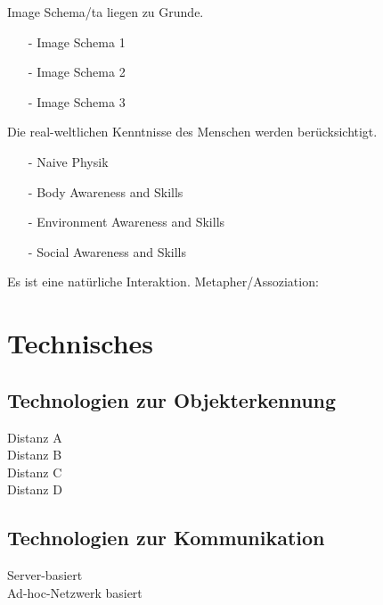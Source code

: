\checkbox{\imageschemata} Image Schema/ta liegen zu Grunde.
\begin{itemize}
\item[-] \checkbox{\imageschemataA} Image Schema 1
\item[-] \checkbox{\imageschemataB} Image Schema 2
\item[-] \checkbox{\imageschemataC} Image Schema 3
\end{itemize}

\checkbox{\realworld} Die real-weltlichen Kenntnisse des Menschen werden berücksichtigt.
\begin{itemize}
\item[-] \checkbox{\realworldA} Naive Physik
\item[-] \checkbox{\realworldB} Body Awareness and Skills
\item[-] \checkbox{\realworldC} Environment Awareness and Skills
\item[-] \checkbox{\realworldD} Social Awareness and Skills
\end{itemize}

\checkbox{\metaphor} Es ist eine natürliche Interaktion. Metapher/Assoziation: 


\section*{Technisches}

\subsection*{Technologien zur Objekterkennung}
\checkbox{\technologyObjectA} Distanz A \\
\checkbox{\technologyObjectB} Distanz B \\
\checkbox{\technologyObjectC} Distanz C \\
\checkbox{\technologyObjectD} Distanz D \\

\technologyObjectDesc

\subsection*{Technologien zur Kommunikation}
\checkbox{\technologyCommunicationServer} Server-basiert \\
\checkbox{\technologyCommunicationAdhoc} Ad-hoc-Netzwerk basiert\\

